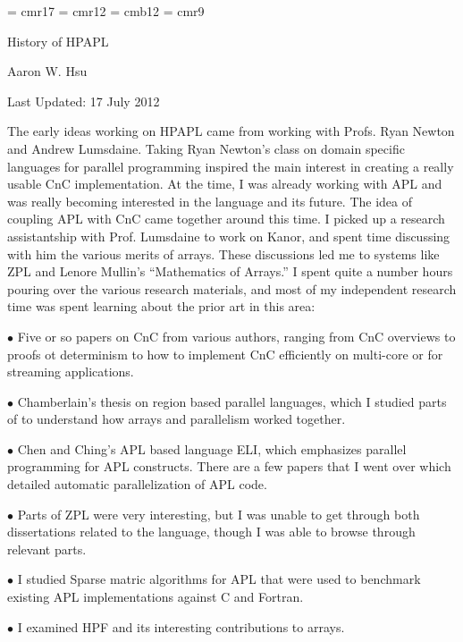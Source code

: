 \font\titlefont = cmr17
\font\bigrm = cmr12
\font\bigbf = cmb12
\font\smallrm = cmr9

\def\heading#1{\noindent{\bigbf #1}\bigskip}
\def\smhead#1{\medskip\noindent{\bf #1.}}
\def\ithead#1{\smallskip\noindent{\it #1.}}

\centerline{\titlefont History of HPAPL}
\medskip
\centerline{Aaron W. Hsu}
\bigskip
\centerline{Last Updated: 17 July 2012}
\bigskip\bigskip

\heading{Early Research: Spring 2012}

\noindent The early ideas working on HPAPL came from working with 
Profs. Ryan Newton and Andrew Lumsdaine. Taking Ryan Newton's class 
on domain specific languages for parallel programming inspired the main 
interest in creating a really usable CnC implementation. At the time, I 
was already working with APL and was really becoming interested in the 
language and its future. The idea of coupling APL with CnC came together 
around this time. I picked up a research assistantship with Prof. Lumsdaine 
to work on Kanor, and spent time discussing with him the various merits 
of arrays. These discussions led me to systems like ZPL and Lenore Mullin's 
``Mathematics of Arrays.'' I spent quite a number hours pouring over 
the various research materials, and most of my independent research time 
was spent learning about the prior art in this area: 

\medskip
\item{$\bullet$} Five or so papers on CnC from various authors, ranging 
from CnC overviews to proofs ot determinism to how to implement CnC 
efficiently on multi-core or for streaming applications.
\item{$\bullet$} Chamberlain's thesis on region based parallel languages, 
which I studied parts of to understand how arrays and parallelism worked 
together.
\item{$\bullet$} Chen and Ching's APL based language ELI, which 
emphasizes parallel programming for APL constructs. There are a few 
papers that I went over which detailed automatic parallelization of 
APL code. 
\item{$\bullet$} Parts of ZPL were very interesting, but I was unable to 
get through both dissertations related to the language, though I was able 
to browse through relevant parts. 
\item{$\bullet$} I studied Sparse matric algorithms for APL that were 
used to benchmark existing APL implementations against C and Fortran.
\item{$\bullet$} I examined HPF and its interesting contributions to arrays.
\medskip

